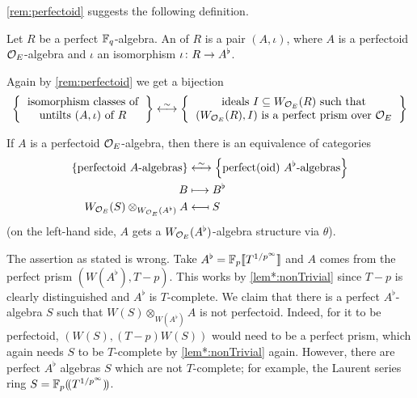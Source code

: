 \documentclass[a4paper, 10pt, oneside, DIV=9, chapterprefix=true, numbers=enddot,bibliography=totoc]{scrbook}
\begin{document}
\cref{rem:perfectoid} suggests the following definition.
\begin{defi}
	Let $R$ be a perfect $\mathbb{F}_q$-algebra. An  of $R$ is a pair $(A,\iota)$, where $A$ is a perfectoid $\mathcal{O}_E$-algebra and $\iota$ an isomorphism $\iota\colon R\morphism A^\flat$.
\end{defi}
Again by \cref{rem:perfectoid} we get a bijection
\begin{equation*}
	\left\{\begin{tabular}{c}
		isomorphism classes of\\
		untilts $(A,\iota)$ of $R$
	\end{tabular}\right\}\lrisomorphism \left\{\begin{tabular}{c}
	ideals $I\subseteq W_{\Oo_E}(R)$ such that\\ $(W_{\Oo_E}(R),I)$
	is a perfect prism over $\Oo_E$
	\end{tabular}\right\}
\end{equation*}
\begin{exc}\label{exc:tilting}
	If $A$ is a perfectoid $\mathcal{O}_E$-algebra, then there is an equivalence of categories
	\begin{align*}
		\left\{\text{perfectoid $A$-algebras}\right\}&\lrisomorphism \left\{\text{perfect(oid) $A^\flat$-algebras}\right\}\\
		B&\longmapsto B^\flat\\
		W_{\Oo_E}(S)\otimes_{W_{\Oo_E}(A^\flat)}A&\longmapsfrom S
	\end{align*}
	(on the left-hand side, $A$ gets a $W_{\mathcal{O}_E}(A^\flat)$-algebra structure via $\theta$).
\end{exc}
\begin{proof*}[Disproof]
	The assertion as stated is wrong. Take $A^\flat=\mathbb{F}_p\llbracket T^{1/p^\infty}\rrbracket$ and $A$ comes from the perfect prism $(W(A^\flat),T-p)$. This works by \cref{lem*:nonTrivial} since $T-p$ is clearly distinguished and $A^\flat$ is $T$-complete. We claim that there is a perfect $A^\flat$-algebra $S$ such that $W(S)\otimes_{W(A^\flat)}A$ is not perfectoid. Indeed, for it to be perfectoid, $(W(S),(T-p)W(S))$ would need to be a perfect prism, which again needs $S$ to be $T$-complete by \cref{lem*:nonTrivial} again. However, there are perfect $A^\flat$ algebras $S$ which are not $T$-complete; for example, the Laurent series ring $S=\mathbb{F}_p(\!(T^{1/p^\infty})\!)$.
\end{proof*}
\end{document}
